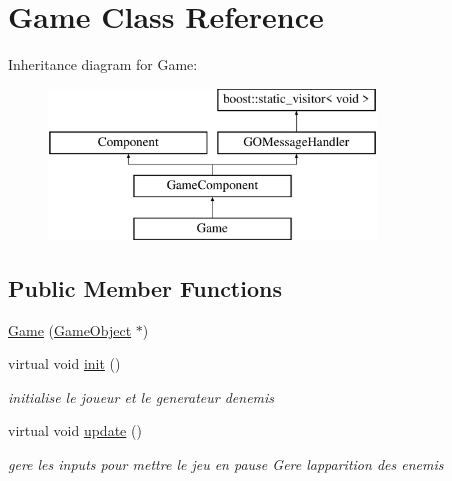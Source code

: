 \hypertarget{class_game}{}\section{Game Class Reference}
\label{class_game}
Inheritance diagram for Game\+:\begin{figure}[H]
\begin{center}
\leavevmode
\includegraphics[height=4.000000cm]{class_game}
\end{center}
\end{figure}
\subsection*{Public Member Functions}
\begin{DoxyCompactItemize}
\item 
\hyperlink{class_game_a366e0d372a100b7de351caf14cede996}{Game} (\hyperlink{class_game_object}{Game\+Object} $\ast$)
\item 
\hypertarget{class_game_a6f3a33940524b6ba9d83f627ccb14bbf}{}\label{class_game_a6f3a33940524b6ba9d83f627ccb14bbf} 
virtual void \hyperlink{class_game_a6f3a33940524b6ba9d83f627ccb14bbf}{init} ()
\begin{DoxyCompactList}\small\item\em initialise le joueur et le generateur d\textquotesingle{}enemis \end{DoxyCompactList}\item 
\hypertarget{class_game_a79df6376b332d63c9eca0dcee30305c3}{}\label{class_game_a79df6376b332d63c9eca0dcee30305c3} 
virtual void \hyperlink{class_game_a79df6376b332d63c9eca0dcee30305c3}{update} ()
\begin{DoxyCompactList}\small\item\em gere les inputs pour mettre le jeu en pause Gere l\textquotesingle{}apparition des enemis \end{DoxyCompactList}\end{DoxyCompactItemize}
